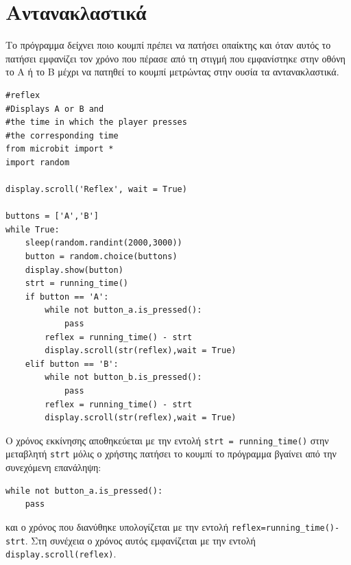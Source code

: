 \documentclass[11pt]{article}
\begin{document}
\section{Αντανακλαστικά}
Το πρόγραμμα δείχνει ποιο κουμπί πρέπει να πατήσει οπαίκτης και όταν αυτός το πατήσει εμφανίζει τον χρόνο που πέρασε από τη 
στιγμή που εμφανίστηκε στην οθόνη το Α ή το Β μέχρι να πατηθεί το κουμπί μετρώντας στην ουσία τα αντανακλαστικά.
\begin{lstlisting}
#reflex
#Displays A or B and
#the time in which the player presses
#the corresponding time
from microbit import *
import random

display.scroll('Reflex', wait = True)

buttons = ['A','B']
while True:
    sleep(random.randint(2000,3000))
    button = random.choice(buttons)
    display.show(button)
    strt = running_time()
    if button == 'A':
        while not button_a.is_pressed():
            pass
        reflex = running_time() - strt
        display.scroll(str(reflex),wait = True)
    elif button == 'B':
        while not button_b.is_pressed():
            pass
        reflex = running_time() - strt
        display.scroll(str(reflex),wait = True)
\end{lstlisting}
Ο χρόνος εκκίνησης αποθηκεύεται με την εντολή \lstinline{strt = running_time()} στην μεταβλητή \lstinline{strt} μόλις ο χρήστης πατήσει
το κουμπί το πρόγραμμα βγαίνει από την συνεχόμενη επανάληψη:
\begin{lstlisting}
while not button_a.is_pressed():
    pass
\end{lstlisting}
και ο χρόνος που διανύθηκε υπολογίζεται με την εντολή \lstinline{reflex=running_time()-strt}. Στη συνέχεια ο χρόνος αυτός εμφανίζεται με την εντολή \lstinline{display.scroll(reflex)}.
\end{document}
